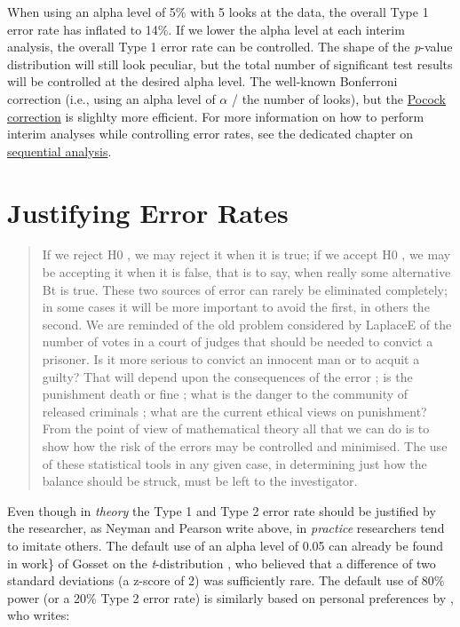 \documentclass[
]{krantz}
\begin{document}
When using an alpha level of 5\% with 5 looks at the data, the overall Type 1 error rate has inflated to 14\%. If we lower the alpha level at each interim analysis, the overall Type 1 error rate can be controlled. The shape of the \emph{p}-value distribution will still look peculiar, but the total number of significant test results will be controlled at the desired alpha level. The well-known Bonferroni correction (i.e., using an alpha level of \(\alpha\) / the number of looks), but the \href{https://en.wikipedia.org/wiki/Pocock_boundary}{Pocock correction} is slighlty more efficient. For more information on how to perform interim analyses while controlling error rates, see the dedicated chapter on \protect\hyperlink{sequential}{sequential analysis}.

\hypertarget{justifyerrorrate}{%
\section{Justifying Error Rates}\label{justifyerrorrate}}

\begin{quote}
If we reject H0 , we may reject it when it is true; if we accept H0 , we may be accepting it when it is false, that is to say, when really some alternative Bt is true. These two sources of error can rarely be eliminated completely; in some cases it will be more important to avoid the first, in others the second. We are reminded of the old problem considered by LaplaceE of the number of votes in a court of judges that should be needed to convict a prisoner. Is it more serious to convict an innocent man or to acquit a guilty? That will depend upon the consequences of the error ; is the punishment death or fine ; what is the danger to the community of released criminals ; what are the current ethical views on punishment? From the point of view of mathematical theory all that we can do is to show how the risk of the errors may be controlled and minimised. The use of these statistical tools in any given case, in determining just how the balance should be struck, must be left to the investigator.
\end{quote}

Even though in \emph{theory} the Type 1 and Type 2 error rate should be justified by the researcher, as Neyman and Pearson \citeyearpar{neyman_problem_1933} write above, in \emph{practice} researchers tend to imitate others. The default use of an alpha level of 0.05 can already be found in work\} of Gosset on the \emph{t}-distribution \citep{cowles_origins_1982, kennedy-shaffer_before_2019}, who believed that a difference of two standard deviations (a z-score of 2) was sufficiently rare. The default use of 80\% power (or a 20\% Type 2 error rate) is similarly based on personal preferences by \citet{cohen_statistical_1988}, who writes:
\end{document}
